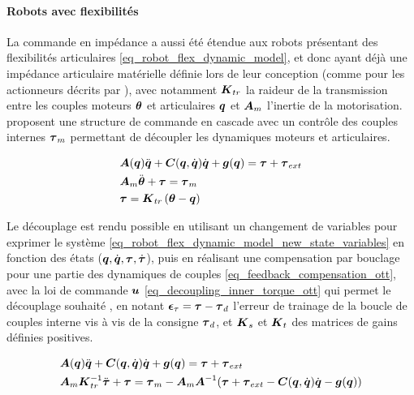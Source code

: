 
\tikzexternalenable 

\paragraph{Robots avec flexibilités} \label{chap2_sec_cmd_collab_subsec_cmd_imp_1_2}

La commande en impédance a aussi été étendue aux robots présentant des flexibilités articulaires \cref{eq_robot_flex_dynamic_model}, et donc ayant déjà une impédance articulaire matérielle définie lors de leur conception (comme pour les actionneurs décrits par \textcite{pratt_series_1995}), avec notamment $\matr{K}_{tr}$ la raideur de la transmission entre les couples moteurs $\vect{\theta}$ et articulaires  $\vect{q}$ et $\matr{A}_{m}$ l'inertie de la motorisation. \textcite{ott_decoupling_2003} proposent une structure de commande en cascade avec un contrôle des couples internes $\vect{\tau}_m $ permettant de découpler les dynamiques moteurs et articulaires.

\begin{equation} \label{eq_robot_flex_dynamic_model}
	\begin{split}
		&\matr{A}(\vect{q})\ddot{\vect{q}} + \matr{C}(\vect{q}, \dot{\vect{q}})\dot{\vect{q}} + \vect{g}(\vect{q}) = \vect{\tau} + \vect{\tau}_{ext} \\
		&\matr{A}_m \ddot{\vect{\theta}} + \vect{\tau} = \vect{\tau}_m \\
		&\vect{\tau} = \matr{K}_{tr} \left(\vect{\theta} - \vect{q}\right)
	\end{split}
\end{equation}

Le découplage est rendu possible en utilisant un changement de variables pour exprimer le système \cref{eq_robot_flex_dynamic_model_new_state_variables} en fonction des états ($\vect{q}, \dot{\vect{q}}, \vect{\tau}, \dot{\vect{\tau}}$), puis en réalisant une compensation par bouclage pour une partie des dynamiques de couples \cref{eq_feedback_compensation_ott}, avec la loi de commande $\vect{u}$ \cref{eq_decoupling_inner_torque_ott} qui permet le découplage souhaité \parencite{ott_decoupling_2003}, en notant $\vect{\epsilon}_\tau = \vect{\tau} - \vect{\tau}_d $ l'erreur de trainage de la boucle de couples interne vis à vis de la consigne $\vect{\tau}_d$, et $\matr{K}_s$ et $\matr{K}_t$ des matrices de gains définies positives.

\begin{equation} \label{eq_robot_flex_dynamic_model_new_state_variables}
	\begin{split}
		&\matr{A}(\vect{q})\ddot{\vect{q}} + \matr{C}(\vect{q}, \dot{\vect{q}})\dot{\vect{q}} + \vect{g}(\vect{q}) = \vect{\tau} + \vect{\tau}_{ext} \\
		&\matr{A}_m\matr{K}_{tr}^{-1} \ddot{\vect{\tau}} + \vect{\tau} = \vect{\tau}_m - \matr{A}_m\matr{A}^{-1}(\vect{\tau} + \vect{\tau}_{ext} - \matr{C}(\vect{q}, \dot{\vect{q}})\dot{\vect{q}} - \vect{g}(\vect{q}))\\
	\end{split}
\end{equation}

